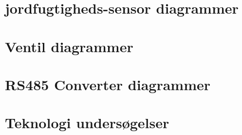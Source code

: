 

\section{jordfugtigheds-sensor diagrammer}



\section{Ventil diagrammer}



\section{RS485 Converter diagrammer}

\section{Teknologi undersøgelser}

